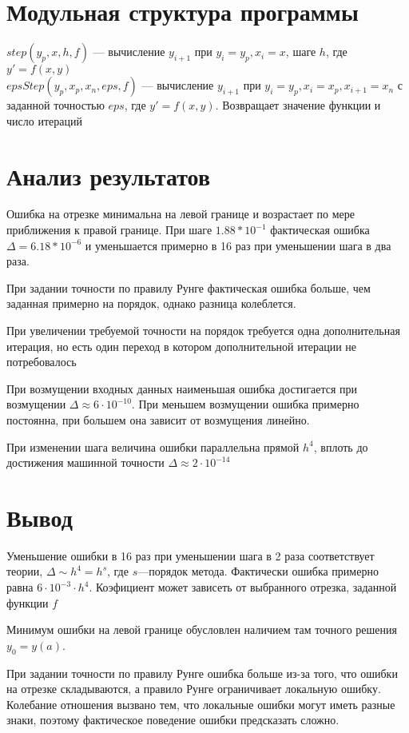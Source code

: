 \documentclass[a4paper]{article}
\begin{document}
\section{Модульная структура программы}\label{sec:S7}
\(step(y_{p},x,h,f)\) --- вычисление \(y_{i+1}\) при \(y_{i} = y_{p}, x_{i} = x\), шаге \(h\), где \(y' = f(x,y)\)\\
\(epsStep(y_{p},x_{p},x_{n},eps,f)\) --- вычисление \(y_{i+1}\) при \(y_{i} = y_{p}, x_{i} = x_{p}, x_{i+1} = x_{n}\) с
заданной точностью \(eps\), где \(y' = f(x,y)\). Возвращает значение функции и число итераций\\
\section{Анализ результатов}\label{sec:S8}
Ошибка на отрезке минимальна на левой границе и возрастает по мере приближения к правой границе. При шаге
\(1.88*10^{-1}\) фактическая ошибка \(\Delta = 6.18*10^{-6}\) и уменьшается примерно в 16 раз при уменьшении шага в два раза.

При задании точности по правилу Рунге фактическая ошибка больше, чем заданная примерно на порядок, однако разница
колеблется.

При увеличении требуемой точности на порядок требуется одна дополнительная итерация, но есть один переход в котором
дополнительной итерации не потребовалось

При возмущении входных данных наименьшая ошибка достигается при возмущении \(\Delta \approx 6\cdot10^{-10}\). При меньшем возмущении
ошибка примерно постоянна, при большем она зависит от возмущения линейно.

При изменении шага величина ошибки параллельна прямой \(h^{4}\), вплоть до достижения машинной точности \(\Delta \approx 2\cdot10^{-14}\)
\section{Вывод}\label{sec:S9}
Уменьшение ошибки в 16 раз при уменьшении шага в 2 раза соответствует теории, \(\Delta \sim h^{4}= h^{s}\), где
\(s\)---порядок метода. Фактически ошибка примерно равна \(6\cdot10^{-3}\cdot h^{4}\). Коэфициент может зависеть от выбранного
отрезка, заданной функции \(f\)

Минимум ошибки на левой границе обусловлен наличием там точного решения \(y_{0} = y(a)\).

При задании точности по правилу Рунге ошибка больше из-за того, что ошибки на отрезке складываются, а правило Рунге
ограничивает локальную ошибку. Колебание отношения вызвано тем, что локальные ошибки могут иметь разные знаки, поэтому
фактическое поведение ошибки предсказать сложно.
\end{document}

